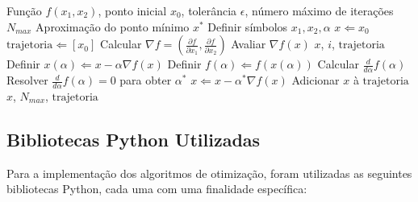 \documentclass[runningheads]{llncs}
\begin{document}
\begin{algorithm}[H]
\caption{Método do Gradiente com Busca Linear Analítica}\label{alg:grad_analitico}
\begin{algorithmic}[1]
\Require Função $f(x_1, x_2)$, ponto inicial $x_0$, tolerância $\epsilon$, número máximo de iterações $N_{max}$
\Ensure Aproximação do ponto mínimo $x^*$
\State Definir símbolos $x_1, x_2, \alpha$
\State $x \Leftarrow x_0$
\State $\text{trajetoria} \Leftarrow [x_0]$
\State Calcular $\nabla f = \left( \frac{\partial f}{\partial x_1}, \frac{\partial f}{\partial x_2} \right)$
    \State Avaliar $\nabla f(x)$
        \State \Return $x$, $i$, $\text{trajetoria}$
    \EndIf
    \State Definir $x(\alpha) \Leftarrow x - \alpha \nabla f(x)$
    \State Definir $f(\alpha) \Leftarrow f(x(\alpha))$
    \State Calcular $\frac{d}{d\alpha} f(\alpha)$
    \State Resolver $\frac{d}{d\alpha} f(\alpha) = 0$ para obter $\alpha^*$
    \State $x \Leftarrow x - \alpha^* \nabla f(x)$
    \State Adicionar $x$ à $\text{trajetoria}$
\EndFor
\State \Return $x$, $N_{max}$, $\text{trajetoria}$
\end{algorithmic}
\end{algorithm}

\subsection{Bibliotecas Python Utilizadas}

Para a implementação dos algoritmos de otimização, foram utilizadas as seguintes bibliotecas Python, cada uma com uma finalidade específica:
\end{document}
